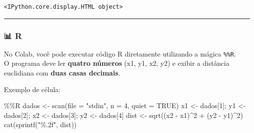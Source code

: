 \documentclass[
  portuguese,
  letterpaper,
  openany,
  oneside,
  12pt,
  a4paper]{book}
\newenvironment{Shaded}{\begin{snugshade}}{\end{snugshade}}
\newcommand{\AttributeTok}[1]{\textcolor[rgb]{0.40,0.45,0.13}{#1}}
\newcommand{\ConstantTok}[1]{\textcolor[rgb]{0.56,0.35,0.01}{#1}}
\newcommand{\DecValTok}[1]{\textcolor[rgb]{0.68,0.00,0.00}{#1}}
\newcommand{\FunctionTok}[1]{\textcolor[rgb]{0.28,0.35,0.67}{#1}}
\newcommand{\NormalTok}[1]{\textcolor[rgb]{0.00,0.23,0.31}{#1}}
\newcommand{\OtherTok}[1]{\textcolor[rgb]{0.00,0.23,0.31}{#1}}
\newcommand{\SpecialCharTok}[1]{\textcolor[rgb]{0.37,0.37,0.37}{#1}}
\newcommand{\StringTok}[1]{\textcolor[rgb]{0.13,0.47,0.30}{#1}}
\begin{document}
\begin{verbatim}
<IPython.core.display.HTML object>
\end{verbatim}

\begin{center}\rule{0.5\linewidth}{0.5pt}\end{center}

\subsubsection{📊 R}\label{r}

No Colab, você pode executar código R diretamente utilizando a mágica
\texttt{\%\%R}.\\
O programa deve ler \textbf{quatro números} (x1, y1, x2, y2) e exibir a
distância euclidiana com \textbf{duas casas decimais}.

Exemplo de célula:

\begin{Shaded}
\begin{Highlighting}[]
\SpecialCharTok{\%\%}\NormalTok{R}
\NormalTok{dados }\OtherTok{\textless{}{-}} \FunctionTok{scan}\NormalTok{(}\AttributeTok{file =} \StringTok{"stdin"}\NormalTok{, }\AttributeTok{n =} \DecValTok{4}\NormalTok{, }\AttributeTok{quiet =} \ConstantTok{TRUE}\NormalTok{)}
\NormalTok{x1 }\OtherTok{\textless{}{-}}\NormalTok{ dados[}\DecValTok{1}\NormalTok{]; y1 }\OtherTok{\textless{}{-}}\NormalTok{ dados[}\DecValTok{2}\NormalTok{]; x2 }\OtherTok{\textless{}{-}}\NormalTok{ dados[}\DecValTok{3}\NormalTok{]; y2 }\OtherTok{\textless{}{-}}\NormalTok{ dados[}\DecValTok{4}\NormalTok{]}
\NormalTok{dist }\OtherTok{\textless{}{-}} \FunctionTok{sqrt}\NormalTok{((x2 }\SpecialCharTok{{-}}\NormalTok{ x1)}\SpecialCharTok{\^{}}\DecValTok{2} \SpecialCharTok{+}\NormalTok{ (y2 }\SpecialCharTok{{-}}\NormalTok{ y1)}\SpecialCharTok{\^{}}\DecValTok{2}\NormalTok{)}
\FunctionTok{cat}\NormalTok{(}\FunctionTok{sprintf}\NormalTok{(}\StringTok{"\%.2f"}\NormalTok{, dist))}
\end{Highlighting}
\end{Shaded}
\end{document}
